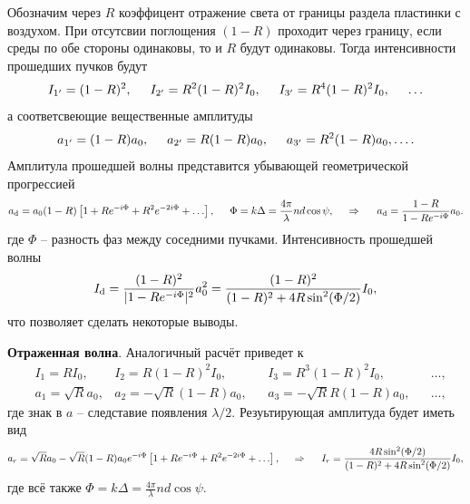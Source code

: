 Обозначим через $R$ коэффицент отражение света от границы раздела пластинки с воздухом. При отсутсвии поглощения $(1-R)$ проходит через границу, если среды по обе стороны одинаковы, то и $R$ будут одинаковы.  Тогда интенсивности прошедших пучков будут
\begin{equation*}
    I_{1'} = (1-R)^2, \hspace{5 mm} 
    I_{2'} = R^2(1-R)^2 I_0, \hspace{5 mm} 
    I_{3'} = R^4 (1-R)^2 I_0, \hspace{5 mm}  \ldots
\end{equation*}
а соответсвеющие вещественные амплитуды
\begin{equation*}
    a_{1'} = (1-R) a_0, \hspace{5 mm} 
    a_{2'} = R(1-R) a_0, \hspace{5 mm} 
    a_{3'} = R^2(1-R) a_0, \ldots .
\end{equation*}
Амплитула прошедшей волны представится убывающей геометрической прогрессией
\begin{equation*}
    a_{\textnormal{d}} = a_0 (1-R)\left[1 + R e^{-i \Phi} + R^2 e^{-2i \Phi} + \ldots\right],
    \hspace{5 mm} 
    \Phi = k \Delta = \frac{4 \pi}{\lambda} n d \cos \psi,
    \hspace{0.5cm} \Rightarrow \hspace{0.5cm}
    a_{\textnormal{d}} = \frac{1-R}{1-R e^{-i\Phi}} a_0.
\end{equation*}
где $\Phi$ -- разность фаз между соседними пучками.  Интенсивность прошедшей волны
\begin{equation*}
    I_{\textnormal{d}} = \frac{(1-R)^2}{|1-R e^{-i \Phi}|^2} a_0^2 = \frac{(1-R)^2}{(1-R)^2 + 4 R \sin^2 (\Phi/2)} I_0,
\end{equation*}
что позволяет сделать некоторые выводы. 



\textbf{Отраженная волна}. Аналогичный расчёт приведет к
\begin{align*}
    &I_1 = R I_0, 
    &I_2 = R(1-R)^2 I_0, 
    &&I_3 = R^3 (1-R)^2 I_0, 
    &&\ldots, \\ 
    &a_1 = \sqrt{R} a_0, 
    &a_2 = - \sqrt{R} (1-R) a_0, 
    &&a_3 = - \sqrt{R} R (1-R) a_0, 
    &&\ldots,
\end{align*}
где знак в $a$ -- следставие появления $\lambda/2$. Резуьтирующая амплитуда будет иметь вид
\begin{equation*}
    a_r = \sqrt{R} a_0 - \sqrt{R} (1-R) a_0 e^{-i \Phi} \left[
        1 + R e^{- i \Phi} + R^2 e^{-2i \Phi} + \ldots
    \right],
    \hspace{0.5cm} \Rightarrow \hspace{0.5cm}
    I_r = \frac{4 R \sin^2 (\Phi/2)}{(1-R)^2 + 4 R \sin^2(\Phi/2)} I_0, 
\end{equation*}
где всё также $\Phi = k \Delta = \frac{4 \pi}{\lambda} n d \cos \psi$.


